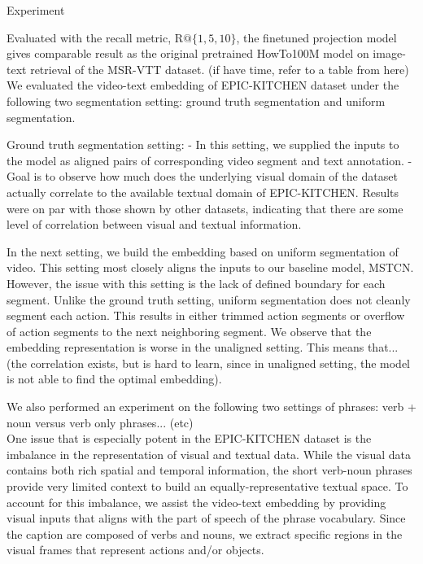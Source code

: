 
Experiment 







Evaluated with the recall metric, R$@\{1,5,10\}$, the finetuned projection model gives comparable result as the original pretrained HowTo100M model on image-text retrieval of the MSR-VTT dataset. (if have time, refer to a table from here)\\

We evaluated the video-text embedding of EPIC-KITCHEN dataset under the following two segmentation setting: ground truth segmentation and uniform segmentation. 

Ground truth segmentation setting:
- In this setting, we supplied the inputs to the model as aligned pairs of corresponding video segment and text annotation.
- Goal is to observe how much does the underlying visual domain of the dataset actually correlate to the available textual domain of EPIC-KITCHEN. Results were on par with those shown by other datasets, indicating that there are some level of correlation between visual and textual information. 

In the next setting, we build the embedding based on uniform segmentation of video. This setting most closely aligns the inputs to our baseline model, MSTCN. However, the issue with this setting is the lack of defined boundary for each segment. Unlike the ground truth setting, uniform segmentation does not cleanly segment each action. This results in either trimmed action segments or overflow of action segments to the next neighboring segment. We observe that the embedding representation is worse in the unaligned setting. This means that... (the correlation exists, but is hard to learn, since in unaligned setting, the model is not able to find the optimal embedding).

We also performed an experiment on the following two settings of phrases: verb + noun versus verb only phrases... (etc)\\

One issue that is especially potent in the EPIC-KITCHEN dataset is the imbalance in the representation of visual and textual data. While the visual data contains both rich spatial and temporal information, the short verb-noun phrases provide very limited context to build an equally-representative textual space. To account for this imbalance, we assist the video-text embedding by providing visual inputs that aligns with the part of speech of the phrase vocabulary. Since the caption are composed of verbs and nouns, we extract specific regions in the visual frames that represent actions and/or objects.\\

